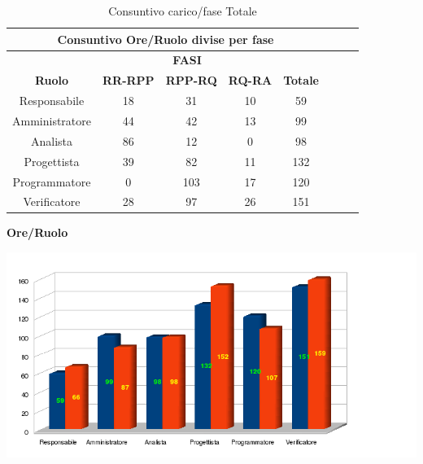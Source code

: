 \begin{table}[!h]
	\begin{center}
		  \begin{tabular}
			  {|c|c|c|c|c|c|c|c|}
		 \hline
			\multicolumn{5}{|c|}{ \textbf{Consuntivo Ore/Ruolo divise per fase} } \\
			\hline
			 & \multicolumn{3}{|c|}{ \textbf{FASI} } & \\
			\hline
			\textbf{Ruolo} & \textbf{RR-RPP} & \textbf{RPP-RQ} & \textbf{RQ-RA} & \textbf{Totale}\\
			\hline
			Responsabile 		&  18  &  31  &  10  &  59 \\ %
			\hline
			Amministratore 		&  44  &  42  &  13 &  99\\ %
			\hline
			Analista   	&  86  &  12 &  0  &  98\\ %
			\hline
			Progettista   	&  39  &  82  &  11  &  132\\ %
			\hline
			Programmatore    &  0  &  103 &  17  &  120\\ %
			\hline
			Verificatore   	&  28  &  97  &  26  &  151\\ %
			\hline		
		\end{tabular}
	\caption{Consuntivo carico/fase Totale} %
	\label{tab:ConsCaricoFase_Totale}
	\end{center}	
\end{table}

\begin{center}\textbf{Ore/Ruolo}
\end{center}
\includegraphics[width=420pt]{Cons-Ore-Totale}


